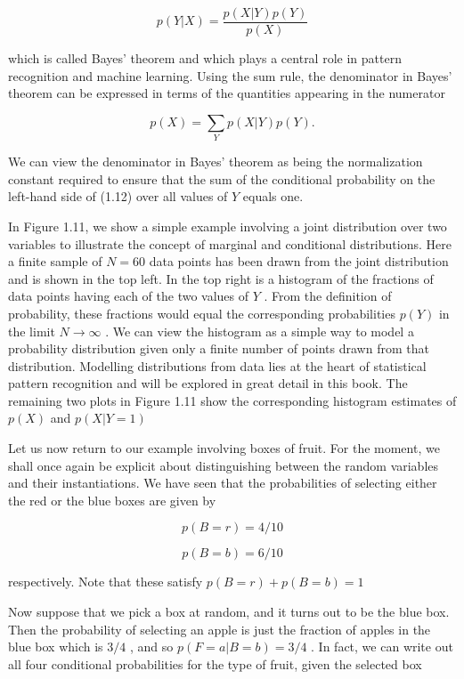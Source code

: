 \documentclass[
  10
]{article}
\begin{document}
\[
p (Y | X) = \frac {p (X | Y) p (Y)}{p (X)}\tag{1.12}
\]

which is called Bayes' theorem and which plays a central role in pattern
recognition and machine learning. Using the sum rule, the denominator in
Bayes' theorem can be expressed in terms of the quantities appearing in
the numerator

\[
p (X) = \sum_ {Y} p (X | Y) p (Y).\tag{1.13}
\]

We can view the denominator in Bayes' theorem as being the normalization
constant required to ensure that the sum of the conditional probability
on the left-hand side of (1.12) over all values of \(Y\) equals one.

In Figure 1.11, we show a simple example involving a joint distribution
over two variables to illustrate the concept of marginal and conditional
distributions. Here a finite sample of \(N = 6 0\) data points has been
drawn from the joint distribution and is shown in the top left. In the
top right is a histogram of the fractions of data points having each of
the two values of \(Y\) . From the definition of probability, these
fractions would equal the corresponding probabilities \(p ( Y )\) in the
limit \(N \to \infty\) . We can view the histogram as a simple way to
model a probability distribution given only a finite number of points
drawn from that distribution. Modelling distributions from data lies at
the heart of statistical pattern recognition and will be explored in
great detail in this book. The remaining two plots in Figure 1.11 show
the corresponding histogram estimates of \(p ( X )\) and
\(p ( X | Y = 1 )\)

Let us now return to our example involving boxes of fruit. For the
moment, we shall once again be explicit about distinguishing between the
random variables and their instantiations. We have seen that the
probabilities of selecting either the red or the blue boxes are given by

\[
p (B = r) = 4 / 1 0\tag{1.14}
\]

\[
p (B = b) = 6 / 1 0\tag{1.15}
\]

respectively. Note that these satisfy \(p ( B = r ) + p ( B = b ) = 1\)

Now suppose that we pick a box at random, and it turns out to be the
blue box. Then the probability of selecting an apple is just the
fraction of apples in the blue box which is \(3 / 4\) , and so
\(p ( F = a | B = b ) = 3 / 4\) . In fact, we can write out all four
conditional probabilities for the type of fruit, given the selected box
\end{document}
